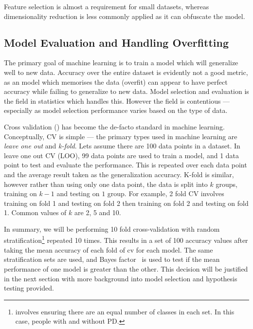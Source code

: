 \documentclass[12pt, twoside]{book}
\renewcommand\emph[1]{\textit{\color{USred}{#1}}}
\begin{document}
\begin{highlight}
Feature selection is almost a requirement for small datasets, whereas dimensionality reduction is less commonly applied as it can obfuscate the model. 
\end{highlight}

\subsection{Model Evaluation and Handling Overfitting}
\label{detectoverfit}
The primary goal of machine learning is to train a model which will generalize well to new data. Accuracy over the entire dataset is evidently not a good metric, as an model which memorises the data (overfit) can appear to have perfect accuracy while failing to generalize to new data. Model selection and evaluation is the field in statistics which handles this. However the field is contentious --- especially as model selection performance varies based on the type of data. 

Cross validation (\emph{CV}) has become the de-facto standard in machine learning. Conceptually, CV is simple --- the primary types used in machine learning are \textit{leave one out} and \textit{k-fold}. Lets assume there are 100 data points in a dataset. In leave one out CV (LOO), 99 data points are used to train a model, and 1 data point to test and evaluate the performance. This is repeated over each  data point and the average result taken as the generalization accuracy. K-fold is similar, however rather than using only one data point, the data is split into $k$ groups, training on $k-1$ and testing on $1$ group. For example, 2 fold CV involves training on fold 1 and testing on fold 2 then training on fold 2 and testing on fold 1. Common values of $k$ are 2, 5 and 10.   

In summary, we will be performing 10 fold cross-validation with random stratification\footnote{\emph{Stratification} involves ensuring there are an equal number of classes in each set. In this case, people with and without PD. } repeated 10 times. This results in a set of 100 accuracy values after taking the mean accuracy of each fold of cv for each model. The same stratification sets are used, and Bayes factor~\cite{bayesianttests} is used to test if the mean performance of one model is greater than the other. This decision will be justified in the next section with more background into model selection and hypothesis testing provided.
\end{document}
